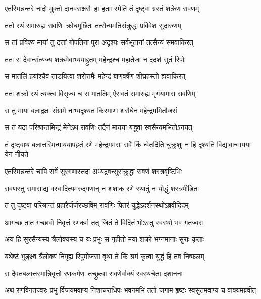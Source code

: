 \twolineshloka
{एतस्मिन्नन्तरे नादो मुक्तो दानवराक्षसैः}
{हा हताः स्मेति तं दृष्ट्वा ग्रस्तं शक्रेण रावणम्} %

\twolineshloka
{ततो रथं समारुह्य रावणिः क्रोधमूर्छितः}
{तत्सैन्यमतिसंक्रुद्धः प्रविवेश सुदारुणम्} %

\twolineshloka
{स तां प्रविश्य मायां तु दत्तां गोपतिना पुरा}
{अदृश्यः सर्वभूतानां तत्सैन्यं समवाकिरत्} %

\twolineshloka
{ततः स देवान्संत्यज्य शक्रमेवाभ्ययाद्द्रुतम्}
{महेन्द्रश्च महातेजा न ददर्श सुतं रिपोः} %

\twolineshloka
{स मातलिं हयांश्चैव ताडयित्वा शरोत्तमैः}
{महेन्द्रं बाणवर्षेण शीघ्रहस्तो ह्यवाकिरत्} %

\twolineshloka
{ततः शक्रो रथं त्यक्त्व विसृज्य च स मातलिम्}
{ऐरावतं समारुह्य मृगयामास रावणिम्} %

\twolineshloka
{स तु माया बलाद्रक्षः संग्रामे नाभ्यदृश्यत}
{किरमाणः शरौघेन महेन्द्रममितौजसं} %

\twolineshloka
{स तं यदा परिश्रान्तमिन्द्रं मेनेऽथ रावणिः}
{तदैनं मायया बद्ध्वा स्वसैन्यमभितोऽनयत्} %

\threelineshloka
{तं दृष्ट्वाथ बलात्तस्मिन्माययापहृतं रणे}
{महेन्द्रममराः सर्वे किं न्वेतदिति चुक्रुशुः}
{न हि दृश्यति विद्यावान्मायया येन नीयते} %

\twolineshloka
{एतस्मिन्नन्तरे चापि सर्वे सुरगणास्तदा}
{अभ्यद्रवन्सुसंक्रुद्धा रावणं शस्त्रवृष्टिभिः} %

\twolineshloka
{रावणस्तु समासाद्य वस्वादित्यमरुद्गणान्}
{न शशाक रणे स्थातुं न योद्धुं शस्त्रपीडितः} %

\twolineshloka
{तं तु दृष्ट्वा परिश्रान्तं प्रहारैर्जर्जरच्छविम्}
{रावणिः पितरं युद्धेऽदर्शनस्थोऽब्रवीदिदम्} %

\twolineshloka
{आगच्छ तात गच्छावो निवृत्तं रणकर्म तत्}
{जितं ते विदितं भोऽस्तु स्वस्थो भव गतज्वरः} %

\twolineshloka
{अयं हि सुरसैन्यस्य त्रैलोक्यस्य च यः प्रभुः}
{स गृहीतो मया शक्रो भग्नमानाः सुराः कृताः} %

\twolineshloka
{यथेष्टं भुङ्क्ष्व त्रैलोक्यं निगृह्य रिपुमोजसा}
{वृथा ते किं श्रमं कृत्वा युद्धं हि तव निष्फलम्} %

\twolineshloka
{स दैवतबलात्तस्मान्निवृत्तो रणकर्मणः}
{तच्छ्रुत्वा रावणेर्वाक्यं स्वस्थचेता दशाननः} %

\fourlineindentedshloka
{अथ रणविगतज्वरः प्रभु}
{र्विजयमवाप्य निशाचराधिपः}
{भवनमभि ततो जगाम हृष्टः}
{ स्वसुतमवाप्य च वाक्यमब्रवीत्} %

